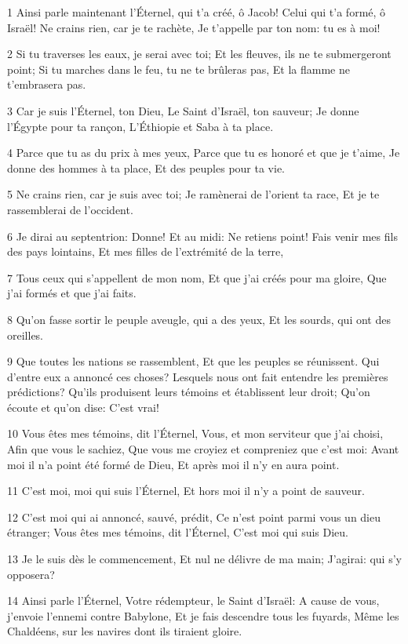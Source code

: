 \par 1 Ainsi parle maintenant l'Éternel, qui t'a créé, ô Jacob! Celui qui t'a formé, ô Israël! Ne crains rien, car je te rachète, Je t'appelle par ton nom: tu es à moi!
\par 2 Si tu traverses les eaux, je serai avec toi; Et les fleuves, ils ne te submergeront point; Si tu marches dans le feu, tu ne te brûleras pas, Et la flamme ne t'embrasera pas.
\par 3 Car je suis l'Éternel, ton Dieu, Le Saint d'Israël, ton sauveur; Je donne l'Égypte pour ta rançon, L'Éthiopie et Saba à ta place.
\par 4 Parce que tu as du prix à mes yeux, Parce que tu es honoré et que je t'aime, Je donne des hommes à ta place, Et des peuples pour ta vie.
\par 5 Ne crains rien, car je suis avec toi; Je ramènerai de l'orient ta race, Et je te rassemblerai de l'occident.
\par 6 Je dirai au septentrion: Donne! Et au midi: Ne retiens point! Fais venir mes fils des pays lointains, Et mes filles de l'extrémité de la terre,
\par 7 Tous ceux qui s'appellent de mon nom, Et que j'ai créés pour ma gloire, Que j'ai formés et que j'ai faits.
\par 8 Qu'on fasse sortir le peuple aveugle, qui a des yeux, Et les sourds, qui ont des oreilles.
\par 9 Que toutes les nations se rassemblent, Et que les peuples se réunissent. Qui d'entre eux a annoncé ces choses? Lesquels nous ont fait entendre les premières prédictions? Qu'ils produisent leurs témoins et établissent leur droit; Qu'on écoute et qu'on dise: C'est vrai!
\par 10 Vous êtes mes témoins, dit l'Éternel, Vous, et mon serviteur que j'ai choisi, Afin que vous le sachiez, Que vous me croyiez et compreniez que c'est moi: Avant moi il n'a point été formé de Dieu, Et après moi il n'y en aura point.
\par 11 C'est moi, moi qui suis l'Éternel, Et hors moi il n'y a point de sauveur.
\par 12 C'est moi qui ai annoncé, sauvé, prédit, Ce n'est point parmi vous un dieu étranger; Vous êtes mes témoins, dit l'Éternel, C'est moi qui suis Dieu.
\par 13 Je le suis dès le commencement, Et nul ne délivre de ma main; J'agirai: qui s'y opposera?
\par 14 Ainsi parle l'Éternel, Votre rédempteur, le Saint d'Israël: A cause de vous, j'envoie l'ennemi contre Babylone, Et je fais descendre tous les fuyards, Même les Chaldéens, sur les navires dont ils tiraient gloire.
